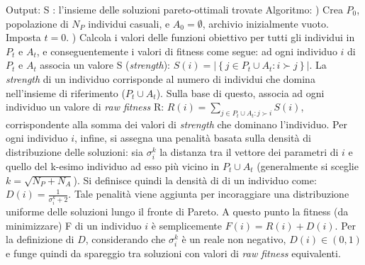 \documentclass[12pt]{article}
\begin{document}
\newline
Output: \newline
\tab \tab S : l'insieme delle soluzioni pareto-ottimali trovate \newline
\newline
Algoritmo:\newline
\tab {}) Crea $P_0$, popolazione di $N_P$ individui casuali, e $A_0 = \emptyset$, archivio inizialmente vuoto. Imposta $t = 0$.\newline
\tab {}) Calcola i valori delle funzioni obiettivo per tutti gli individui in $P_t$ e $A_t$, e conseguentemente i valori di fitness come segue: \newline
ad ogni individuo $i$ di $P_t$ e $A_t$ associa un valore S (\textit{strength}): \newline
\newline
 $S(i) = |\left\{ j \in P_t \cup A_t : i \succ j \right\}|$.  \newline 
\newline
La \textit{strength} di un individuo corrisponde al numero di individui che domina nell'insieme di riferimento ($P_t \cup A_t$). Sulla base di questo, associa ad ogni individuo un valore di \textit{raw fitness} R: \newline
\newline
$R(i) = \underset{j \in P_t \cup A_t : j \succ i}{\sum} S(i)$, \newline
\newline
corrispondente alla somma dei valori di \textit{strength} che dominano l'individuo. Per ogni individuo $i$, infine, si assegna una penalità basata sulla densità di distribuzione delle soluzioni: sia $\sigma_i^k$ la distanza tra il vettore dei parametri di $i$ e quello del k-esimo individuo ad esso più vicino in $P_t \cup A_t$ (generalmente si sceglie $k = \sqrt{N_P + N_A}$). Si definisce quindi la densità di di un individuo come:\newline
\newline
$D(i) = \frac{\displaystyle 1}{\displaystyle \sigma_i^k + 2}$.\newline
\newline
Tale penalità viene aggiunta per incoraggiare una distribuzione uniforme delle soluzioni lungo il fronte di Pareto. \newline 
A questo punto la fitness (da minimizzare) F di un individuo $i$ è semplicemente $F(i) = R(i) + D(i)$.\newline
Per la definizione di $D$, considerando che $\sigma_i^k$ è un reale non negativo, $D(i) \in \left( 0, 1 \right)$ e funge quindi da spareggio tra soluzioni con valori di \textit{raw fitness} equivalenti. \newline
\end{document}
